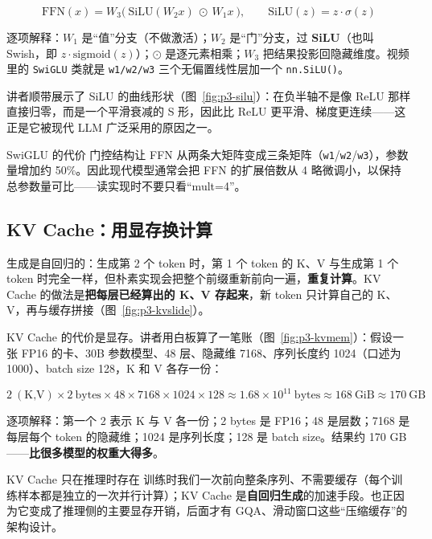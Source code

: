 $$\mathrm{FFN}(x) = W_3\big(\ \mathrm{SiLU}(W_2 x)\ \odot\ W_1 x\ \big),\qquad \mathrm{SiLU}(z) = z\cdot\sigma(z)$$

逐项解释：$W_1$ 是“值”分支（不做激活）；$W_2$ 是“门”分支，过 \textbf{SiLU}（也叫 Swish，即 $z\cdot\mathrm{sigmoid}(z)$）；$\odot$ 是逐元素相乘；$W_3$ 把结果投影回隐藏维度。视频里的 \texttt{SwiGLU} 类就是 \texttt{w1/w2/w3} 三个无偏置线性层加一个 \texttt{nn.SiLU()}。

讲者顺带展示了 SiLU 的曲线形状（图~\ref{fig:p3-silu}）：在负半轴不是像 ReLU 那样直接归零，而是一个平滑衰减的 S 形，因此比 ReLU 更平滑、梯度更连续——这正是它被现代 LLM 广泛采用的原因之一。

\begin{knowledgebox}{SwiGLU 的代价}
门控结构让 FFN 从两条大矩阵变成三条矩阵（\texttt{w1}/\texttt{w2}/\texttt{w3}），参数量增加约 50\%。因此现代模型通常会把 FFN 的扩展倍数从 4 略微调小，以保持总参数量可比——读实现时不要只看“mult=4”。
\end{knowledgebox}

\subsection{KV Cache：用显存换计算}

生成是自回归的：生成第 2 个 token 时，第 1 个 token 的 K、V 与生成第 1 个 token 时完全一样，但朴素实现会把整个前缀重新前向一遍，\textbf{重复计算}。KV Cache 的做法是\textbf{把每层已经算出的 K、V 存起来}，新 token 只计算自己的 K、V，再与缓存拼接（图~\ref{fig:p3-kvslide}）。

KV Cache 的代价是显存。讲者用白板算了一笔账（图~\ref{fig:p3-kvmem}）：假设一张 FP16 的卡、30B 参数模型、48 层、隐藏维 7168、序列长度约 1024（口述为 1000）、batch size 128，K 和 V 各存一份：

$$2\ (\text{K,V}) \times 2\ \text{bytes} \times 48 \times 7168 \times 1024 \times 128 \approx 1.68\times 10^{11}\ \text{bytes} \approx 168\ \text{GiB} \approx 170\ \text{GB}$$

逐项解释：第一个 2 表示 K 与 V 各一份；2 bytes 是 FP16；48 是层数；7168 是每层每个 token 的隐藏维；1024 是序列长度；128 是 batch size。结果约 170 GB——\textbf{比很多模型的权重大得多}。

\begin{warningbox}{KV Cache 只在推理时存在}
训练时我们一次前向整条序列、不需要缓存（每个训练样本都是独立的一次并行计算）；KV Cache 是\textbf{自回归生成}的加速手段。也正因为它变成了推理侧的主要显存开销，后面才有 GQA、滑动窗口这些“压缩缓存”的架构设计。
\end{warningbox}

